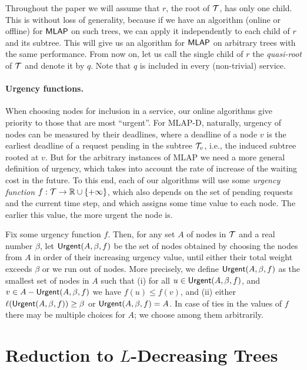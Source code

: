 \documentclass[a4paper]{article}
\newcommand{\calT}{{\cal T}}
\newcommand{\length}{\ell}
\newcommand{\reals}{{\mathbb R}}
\newcommand{\MLAP}{\mbox{\rm\textsf{MLAP}}}
\newcommand{\MLAPD}{\mbox{\rm\textsf{MLAP-D}}}
\newcommand{\urgentnodes}{\mbox{\rm\textsf{Urgent}}}
\begin{document}
Throughout the paper we will
assume that $r$, the root of $\calT$, has only one child. This
is without loss of generality, because if we have an algorithm (online
or offline) for $\MLAP$ on such trees, we can apply it independently to each
child of $r$ and its subtree. This will give us an algorithm for $\MLAP$ on
arbitrary trees with the same performance. From now on, let us call
the single child of $r$ the \emph{quasi-root} of $\calT$ and denote it by
$q$.  Note that $q$ is included in every (non-trivial) service.


\paragraph{Urgency functions.}

When choosing nodes for inclusion in a service, our online algorithms
give priority to those that are most ``urgent''.  For {\MLAPD},
naturally, urgency of nodes can be measured by their deadlines, where
a deadline of a node $v$ is the earliest deadline of a request pending
in the subtree $\calT_v$, i.e., the induced subtree rooted at $v$.
But for the arbitrary instances of {\MLAP} we need a more general
definition of urgency, which takes into account the rate of increase
of the waiting cost in the future.  To this end, each of our
algorithms will use some \emph{urgency function} $f:\calT\rightarrow
\reals\cup\{+\infty\}$, which also depends on the set of pending
requests and the current time step, and which assigns some time value
to each node. The earlier this value, the more urgent the node is.

Fix some urgency function $f$. Then,
for any set $A$ of nodes in $\calT$ and a real number $\beta$, let
$\urgentnodes(A,\beta,f)$ be the set of nodes obtained by choosing the
nodes from $A$ in order of their increasing urgency value, until either their total weight exceeds $\beta$
or we run out of nodes.
More precisely, we define $\urgentnodes(A,\beta,f)$ as the
smallest set of nodes in $A$ such that 
(i)  for all $u\in \urgentnodes(A,\beta,f)$, and $v\in
A-\urgentnodes(A,\beta,f)$ we have $f(u)\leq f(v)$, 
and 
(ii) either $\length(\urgentnodes(A,\beta,f))\ge\beta$ or
$\urgentnodes(A,\beta,f)=A$.
In case of ties in the values of $f$ there may be multiple choices for
$A$; we choose among them arbitrarily.



\section{Reduction to $L$-Decreasing Trees}
\label{sec: reduction to L-decreasing trees}
\end{document}

